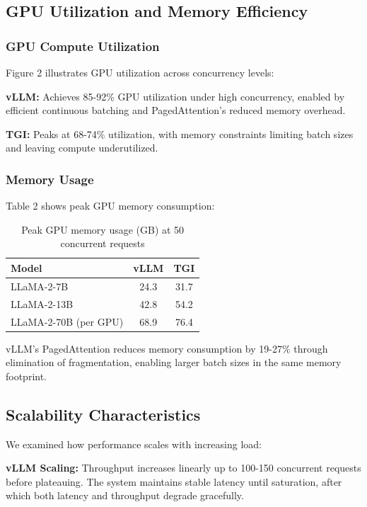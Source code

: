 \documentclass{article}
\begin{document}
\subsection{GPU Utilization and Memory Efficiency}

\subsubsection{GPU Compute Utilization}

Figure 2 illustrates GPU utilization across concurrency levels:

\textbf{vLLM:} Achieves 85-92\% GPU utilization under high concurrency, enabled by efficient continuous batching and PagedAttention's reduced memory overhead.

\textbf{TGI:} Peaks at 68-74\% utilization, with memory constraints limiting batch sizes and leaving compute underutilized.

\subsubsection{Memory Usage}

Table 2 shows peak GPU memory consumption:

\begin{table}[h]
\centering
\caption{Peak GPU memory usage (GB) at 50 concurrent requests}
\begin{tabular}{lcc}
\toprule
Model & vLLM & TGI \\
\midrule
LLaMA-2-7B & 24.3 & 31.7 \\
LLaMA-2-13B & 42.8 & 54.2 \\
LLaMA-2-70B (per GPU) & 68.9 & 76.4 \\
\bottomrule
\end{tabular}
\end{table}

vLLM's PagedAttention reduces memory consumption by 19-27\% through elimination of fragmentation, enabling larger batch sizes in the same memory footprint.

\subsection{Scalability Characteristics}

We examined how performance scales with increasing load:

\textbf{vLLM Scaling:} Throughput increases linearly up to 100-150 concurrent requests before plateauing. The system maintains stable latency until saturation, after which both latency and throughput degrade gracefully.
\end{document}
